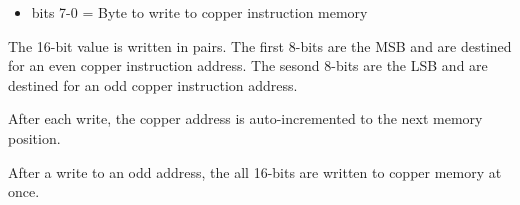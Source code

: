\begin{itemize}
\item bits 7-0 = Byte to write to copper instruction memory
\end{itemize}
The 16-bit value is written in pairs. The first 8-bits are the MSB and
are destined for an even copper instruction address. The sesond 8-bits
are the LSB and are destined for an odd copper instruction address.

After each write, the copper address is auto-incremented to the next
memory position.

After a write to an odd address, the all 16-bits are written to copper
memory at once.

